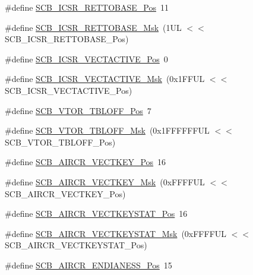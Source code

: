 \begin{DoxyCompactItemize}
\item 
\#define \hyperlink{group___c_m_s_i_s___s_c_b_ga403d154200242629e6d2764bfc12a7ec}{S\-C\-B\-\_\-\-I\-C\-S\-R\-\_\-\-R\-E\-T\-T\-O\-B\-A\-S\-E\-\_\-\-Pos}~11
\item 
\#define \hyperlink{group___c_m_s_i_s___s_c_b_gaca6fc3f79bb550f64fd7df782ed4a5f6}{S\-C\-B\-\_\-\-I\-C\-S\-R\-\_\-\-R\-E\-T\-T\-O\-B\-A\-S\-E\-\_\-\-Msk}~(1\-U\-L $<$$<$ S\-C\-B\-\_\-\-I\-C\-S\-R\-\_\-\-R\-E\-T\-T\-O\-B\-A\-S\-E\-\_\-\-Pos)
\item 
\#define \hyperlink{group___c_m_s_i_s___s_c_b_gae4f602c7c5c895d5fb687b71b0979fc3}{S\-C\-B\-\_\-\-I\-C\-S\-R\-\_\-\-V\-E\-C\-T\-A\-C\-T\-I\-V\-E\-\_\-\-Pos}~0
\item 
\#define \hyperlink{group___c_m_s_i_s___s_c_b_ga5533791a4ecf1b9301c883047b3e8396}{S\-C\-B\-\_\-\-I\-C\-S\-R\-\_\-\-V\-E\-C\-T\-A\-C\-T\-I\-V\-E\-\_\-\-Msk}~(0x1\-F\-F\-U\-L $<$$<$ S\-C\-B\-\_\-\-I\-C\-S\-R\-\_\-\-V\-E\-C\-T\-A\-C\-T\-I\-V\-E\-\_\-\-Pos)
\item 
\#define \hyperlink{group___c_m_s_i_s___s_c_b_gac6a55451ddd38bffcff5a211d29cea78}{S\-C\-B\-\_\-\-V\-T\-O\-R\-\_\-\-T\-B\-L\-O\-F\-F\-\_\-\-Pos}~7
\item 
\#define \hyperlink{group___c_m_s_i_s___s_c_b_ga75e395ed74042923e8c93edf50f0996c}{S\-C\-B\-\_\-\-V\-T\-O\-R\-\_\-\-T\-B\-L\-O\-F\-F\-\_\-\-Msk}~(0x1\-F\-F\-F\-F\-F\-F\-U\-L $<$$<$ S\-C\-B\-\_\-\-V\-T\-O\-R\-\_\-\-T\-B\-L\-O\-F\-F\-\_\-\-Pos)
\item 
\#define \hyperlink{group___c_m_s_i_s___s_c_b_gaaa27c0ba600bf82c3da08c748845b640}{S\-C\-B\-\_\-\-A\-I\-R\-C\-R\-\_\-\-V\-E\-C\-T\-K\-E\-Y\-\_\-\-Pos}~16
\item 
\#define \hyperlink{group___c_m_s_i_s___s_c_b_ga90c7cf0c490e7ae55f9503a7fda1dd22}{S\-C\-B\-\_\-\-A\-I\-R\-C\-R\-\_\-\-V\-E\-C\-T\-K\-E\-Y\-\_\-\-Msk}~(0x\-F\-F\-F\-F\-U\-L $<$$<$ S\-C\-B\-\_\-\-A\-I\-R\-C\-R\-\_\-\-V\-E\-C\-T\-K\-E\-Y\-\_\-\-Pos)
\item 
\#define \hyperlink{group___c_m_s_i_s___s_c_b_gaec404750ff5ca07f499a3c06b62051ef}{S\-C\-B\-\_\-\-A\-I\-R\-C\-R\-\_\-\-V\-E\-C\-T\-K\-E\-Y\-S\-T\-A\-T\-\_\-\-Pos}~16
\item 
\#define \hyperlink{group___c_m_s_i_s___s_c_b_gabacedaefeefc73d666bbe59ece904493}{S\-C\-B\-\_\-\-A\-I\-R\-C\-R\-\_\-\-V\-E\-C\-T\-K\-E\-Y\-S\-T\-A\-T\-\_\-\-Msk}~(0x\-F\-F\-F\-F\-U\-L $<$$<$ S\-C\-B\-\_\-\-A\-I\-R\-C\-R\-\_\-\-V\-E\-C\-T\-K\-E\-Y\-S\-T\-A\-T\-\_\-\-Pos)
\item 
\#define \hyperlink{group___c_m_s_i_s___s_c_b_gad31dec98fbc0d33ace63cb1f1a927923}{S\-C\-B\-\_\-\-A\-I\-R\-C\-R\-\_\-\-E\-N\-D\-I\-A\-N\-E\-S\-S\-\_\-\-Pos}~15
$$
\end{DoxyCompactItemize}
